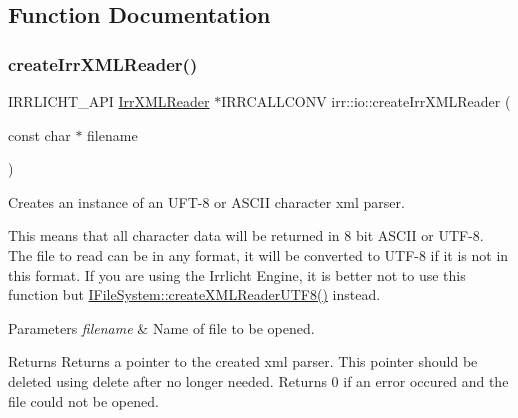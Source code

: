 \subsection{Function Documentation}
\mbox{\label{namespaceirr_1_1io_a638e38fd4c6d6e40ce4f332be6a3b570}} 
\subsubsection{\texorpdfstring{create\+Irr\+X\+M\+L\+Reader()}{createIrrXMLReader()}\hspace{0.1cm}{\footnotesize\ttfamily [1/3]}}
{\footnotesize\ttfamily I\+R\+R\+L\+I\+C\+H\+T\+\_\+\+A\+PI \hyperlink{namespaceirr_1_1io_a682f8a2c4c57259bfde1ec8fa27a565b}{Irr\+X\+M\+L\+Reader} $\ast$I\+R\+R\+C\+A\+L\+L\+C\+O\+NV irr\+::io\+::create\+Irr\+X\+M\+L\+Reader (\begin{DoxyParamCaption}\item[{const char $\ast$}]{filename }\end{DoxyParamCaption})}



Creates an instance of an U\+F\+T-\/8 or A\+S\+C\+II character xml parser. 

This means that all character data will be returned in 8 bit A\+S\+C\+II or U\+T\+F-\/8. The file to read can be in any format, it will be converted to U\+T\+F-\/8 if it is not in this format. If you are using the Irrlicht Engine, it is better not to use this function but \hyperlink{classirr_1_1io_1_1IFileSystem_affd8f622ac7c3dcd507f20f9cd23b21f}{I\+File\+System\+::create\+X\+M\+L\+Reader\+U\+T\+F8()} instead. 
\begin{DoxyParams}{Parameters}
{\em filename} & Name of file to be opened. \\
\hline
\end{DoxyParams}
\begin{DoxyReturn}{Returns}
Returns a pointer to the created xml parser. This pointer should be deleted using \textquotesingle{}delete\textquotesingle{} after no longer needed. Returns 0 if an error occured and the file could not be opened. 
\end{DoxyReturn}
\mbox{\label{namespaceirr_1_1io_a73fba8aac42e3dd228a0b67a4c79df03}} 
